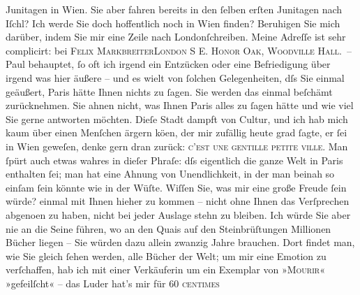 \begin{ledgroupsized}[t]{13cm}
               Junitagen in Wien. Sie aber fahren bereits in den
               ſelben erſten Junitagen nach Iſchl?\pend
           \pstart
           Ich werde Sie doch hoffentlich noch in Wien
               finden? Beruhigen {\pb}Sie mich darüber, indem Sie mir
               eine Zeile nach Londonſchreiben. Meine Adreſſe ist sehr complicirt: bei
                  \textsc{Felix MarkbreiterLondon S E. Honor Oak, Woodville Hall}. –\pend
           \pstart
           Paul behauptet, ſo oft ich irgend ein
               Entzücken oder eine Befriedigung über irgend was hier äußere – und es wi{\geminationm}elt von ſolchen Gelegenheiten, dſs Sie einmal ge{\pb}äußert, Paris
               hätte Ihnen nichts zu ſagen. Sie werden das einmal beſchämt zurücknehmen. Sie ahnen
               nicht, was Ihnen Paris alles zu ſagen hätte und
               wie viel Sie gerne antworten möchten. Dieſe Stadt dampft von Cultur, und ich hab mich
               kaum über einen Menſchen ärgern kö{\geminationn}en, der mir zufällig
               heute grad ſagte, er ſei in Wien geweſen, {\pb}denke gern dran zurück: \textsc{c’est une
                  gentille petite ville}. Man ſpürt auch etwas wahres in dieſer Phraſe: dſs
               eigentlich die ganze Welt in Paris enthalten ſei;
               man hat eine Ahnung von Unendlichkeit, in der man beinah so einſam ſein könnte wie in
               der Wüſte. Wiſſen Sie, was mir eine große Freude ſein würde? einmal mit Ihnen hieher
               zu kommen – nicht {\pb}ohne Ihnen das Verſprechen abgeno{\geminationm}en zu haben, nicht bei jeder Auslage stehn zu bleiben.
               Ich würde Sie aber nie an die Seine führen, wo an den Quais auf den Steinbrüſtungen
               Millionen Bücher liegen – Sie würden dazu allein zwanzig Jahre brauchen. Dort findet
               man, wie Sie gleich ſehen werden, alle Bücher der Welt; {\pb}um mir eine Emotion zu verſchaffen, hab ich mit einer
               Verkäuferin um ein Exemplar von »\textsc{Mourir}« »gefeilſcht« – das Luder hat’s mir für 60 \textsc{centimes}

\end{ledgroupsized}

